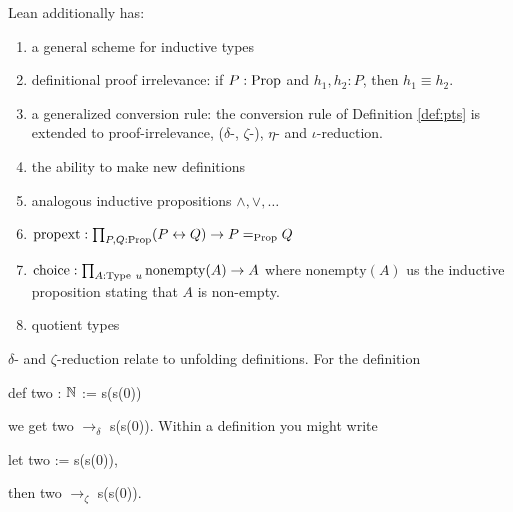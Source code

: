 \begin{rem}
    Lean additionally has: 
    \begin{enumerate}
        \item a general scheme for inductive types
        \item definitional proof irrelevance: if $P : \mathrm{Prop}$ and $h_1, h_2 : P$, then $h_1 \equiv h_2$.
        \item a generalized conversion rule: the conversion rule of Definition \ref{def:pts} is extended to proof-irrelevance, ($\delta$-, $\zeta$-), $\eta$- and $\iota$-reduction.
        \item the ability to make new definitions
        \item analogous inductive propositions ${\wedge}, {\vee}, \dots$
        \item $\mathrm{propext}: \prod_{P, Q : \mathrm{Prop}} (P \leftrightarrow Q) \to P \mathrel{=_{\mathrm{Prop}}} Q$
        \item $\mathrm{choice} : \prod_{A : \mathrm{Type}\ u} \mathrm{nonempty}(A) \to A$ where $\mathrm{nonempty}(A)$ us the inductive proposition stating that $A$ is non-empty.
        \item quotient types
    \end{enumerate}
\end{rem}

\begin{example}
    $\delta$- and $\zeta$-reduction relate to unfolding definitions.
    For the definition 
    \begin{center}
        {\ttfamily def two : $\mathbb{N}$ := s(s(0))}
    \end{center} 
    we get {\ttfamily two $\mathrel{\to_\delta}$ s(s(0))}. 
    Within a definition you might write 
    \begin{center}
        {\ttfamily let two := s(s(0))}, 
    \end{center}
    then {\ttfamily two $\to_{\zeta}$ s(s(0))}.
\end{example}